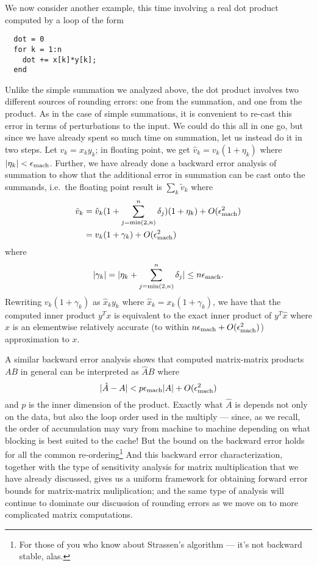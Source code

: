 \documentclass[12pt, leqno]{article} %
\begin{document}
We now consider another example, this time involving
a real dot product computed by a loop of the form
\begin{lstlisting}
  dot = 0
  for k = 1:n
    dot += x[k]*y[k];
  end
\end{lstlisting}
Unlike the simple summation we analyzed above, the dot product involves
two different sources of rounding errors: one from the summation,
and one from the product.  As in the case of simple summations, it is
convenient to re-cast this error in terms of perturbations to the input.
We could do this all in one go, but since we have already spent so much
time on summation, let us instead do it in two steps.  Let $v_k = x_k y_k$;
in floating point, we get $\hat{v}_k = v_k (1+\eta_k)$
where $|\eta_k| < \epsilon_{\mathrm{mach}}$.  Further,
we have already done a backward error analysis of summation to show
that the additional error in summation can be cast onto the summands,
i.e.~the floating point result is $\sum_k \tilde{v}_k$ where
\begin{align*}
  \tilde{v}_k
  &= \hat{v}_k (1 + \sum_{j=\min(2,n)}^n \delta_j) (1 + \eta_k) + O(\epsilon_{\mathrm{mach}}^2) \\
  &= v_k (1+\gamma_k) + O(\epsilon_{\mathrm{mach}}^2)
\end{align*}
where
\[
  |\gamma_k| = |\eta_k + \sum_{j=\min(2,n)}^n \delta_j| \leq n \epsilon_{\mathrm{mach}}.
\]
Rewriting $v_k(1+\gamma_k)$ as $\hat{x}_k y_k$ where
$\hat{x}_k = x_k (1+\gamma_k)$, we have that the computed inner
product $y^T x$ is equivalent to the exact inner product of $y^T \hat{x}$
where $\hat{x}$ is an elementwise relatively accurate
(to within $n \epsilon_{\mathrm{mach}} + O(\epsilon_{\mathrm{mach}}^2)$) approximation to $x$.

A similar backward error analysis shows that computed matrix-matrix
products $AB$ in general can be interpreted as $\hat{A} B$ where
\[
  |\hat{A}-A| < p \epsilon_{\mathrm{mach}} |A| + O(\epsilon_{\mathrm{mach}}^2)
\]
and $p$ is the inner dimension of the product.  Exactly what $\hat{A}$
is depends not only on the data, but also the loop order used in the
multiply --- since, as we recall, the order of accumulation may vary
from machine to machine depending on what blocking is best suited to
the cache!  But the bound on the backward error holds for all the common
re-ordering\footnote{%
For those of you who know about Strassen's algorithm --- it's not
backward stable, alas.
}
And this backward error characterization, together with the
type of sensitivity analysis for matrix multiplication that we have
already discussed, gives us a uniform framework for obtaining
forward error bounds for matrix-matrix muliplication; and the same
type of analysis will continue to dominate our discussion of rounding
errors as we move on to more complicated matrix computations.
\end{document}
